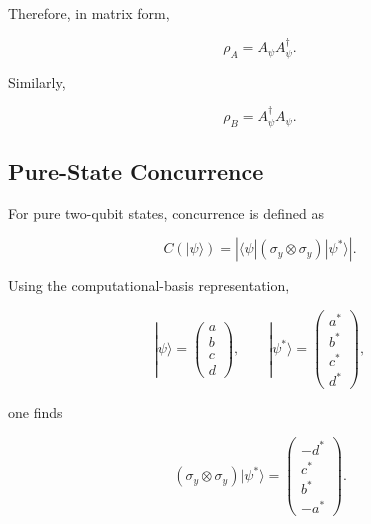 Therefore, in matrix form,

\begin{equation}
\rho_A
=
A_\psi A_\psi^\dagger.
\label{eq:rhoA_coefficient_matrix_relation}
\end{equation}

Similarly,

\begin{equation}
\rho_B
=
A_\psi^\dagger A_\psi.
\label{eq:rhoB_coefficient_matrix_relation}
\end{equation}


\subsection*{Pure-State Concurrence}

For pure two-qubit states, concurrence is defined as

\begin{equation}
C(|\psi\rangle)
=
\left|
\langle \psi |
(\sigma_y \otimes \sigma_y)
|\psi^*\rangle
\right|.
\label{eq:pure_state_concurrence_definition}
\end{equation}

Using the computational-basis representation,

\begin{equation}
|\psi\rangle
=
\begin{pmatrix}
a\\
b\\
c\\
d
\end{pmatrix},
\qquad
|\psi^*\rangle
=
\begin{pmatrix}
a^*\\
b^*\\
c^*\\
d^*
\end{pmatrix},
\label{eq:computational_basis_state_vectors}
\end{equation}

one finds

\begin{equation}
(\sigma_y \otimes \sigma_y)
|\psi^*\rangle
=
\begin{pmatrix}
- d^*\\
c^*\\
b^*\\
- a^*
\end{pmatrix}.
\label{eq:spin_flip_action}
\end{equation}

